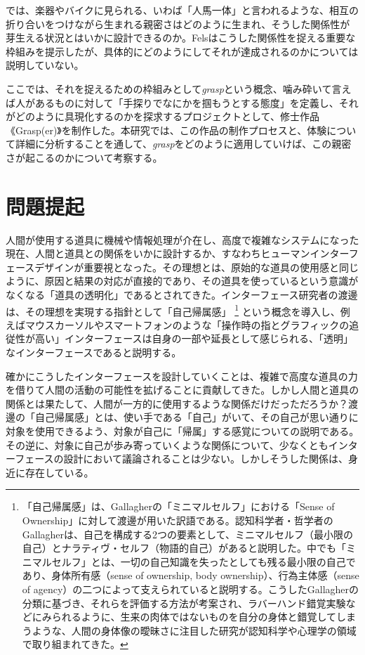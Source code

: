 では、楽器やバイクに見られる、いわば「人馬一体」と言われるような、相互の折り合いをつけながら生まれる親密さはどのように生まれ、そうした関係性が芽生える状況とはいかに設計できるのか。Felsはこうした関係性を捉える重要な枠組みを提示したが、具体的にどのようにしてそれが達成されるのかについては説明していない。

ここでは、それを捉えるための枠組みとして\textit{grasp}という概念、噛み砕いて言えば人があるものに対して「手探りでなにかを掴もうとする態度」を定義し、それがどのように具現化するのかを探求するプロジェクトとして、修士作品《Grasp(er)》を制作した。本研究では、この作品の制作プロセスと、体験について詳細に分析することを通して、\textit{grasp}をどのように適用していけば、この親密さが起こるのかについて考察する。

\section{問題提起}
\label{subject}
人間が使用する道具に機械や情報処理が介在し、高度で複雑なシステムになった現在、人間と道具との関係をいかに設計するか、すなわちヒューマンインターフェースデザインが重要視となった。その理想とは、原始的な道具の使用感と同じように、原因と結果の対応が直接的であり、その道具を使っているという意識がなくなる「道具の透明化」であるとされてきた\cite{Watanabe2017}。インターフェース研究者の渡邊は、その理想を実現する指針として「自己帰属感」
\footnote{「自己帰属感」は、Gallagherの「ミニマルセルフ」における「Sense of Ownership」に対して渡邊が用いた訳語である\cite{Watanabe2017}。認知科学者・哲学者のGallagherは、自己を構成する2つの要素として、ミニマルセルフ（最小限の自己）とナラティヴ・セルフ（物語的自己）があると説明した\cite{Gallagher2000}。中でも「ミニマルセルフ」とは、一切の自己知識を失ったとしても残る最小限の自己であり、身体所有感（sense of ownership, body ownership）、行為主体感（sense of agency）の二つによって支えられていると説明する。こうしたGallagherの分類に基づき、それらを評価する方法が考案され、ラバーハンド錯覚実験などにみられるように、生来の肉体ではないものを自分の身体と錯覚してしまうような、人間の身体像の曖昧さに注目した研究が認知科学や心理学の領域で取り組まれてきた。}
という概念を導入し、例えばマウスカーソルやスマートフォンのような「操作時の指とグラフィックの追従性が高い」インターフェースは自身の一部や延長として感じられる、「透明」なインターフェースであると説明する。

確かにこうしたインターフェースを設計していくことは、複雑で高度な道具の力を借りて人間の活動の可能性を拡げることに貢献してきた。しかし人間と道具の関係とは果たして、人間が一方的に使用するような関係だけだっただろうか？渡邊の「自己帰属感」とは、使い手である「自己」がいて、その自己が思い通りに対象を使用できるよう、対象が自己に「帰属」する感覚についての説明である。その逆に、対象に自己が歩み寄っていくような関係について、少なくともインターフェースの設計において議論されることは少ない。しかしそうした関係は、身近に存在している。

